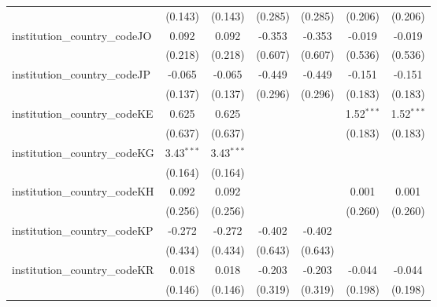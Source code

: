 \begin{tabular}{lcccccc}
                                         & (0.143)        & (0.143)        & (0.285)        & (0.285)        & (0.206)        & (0.206)\\   
   institution\_country\_codeJO          & 0.092          & 0.092          & -0.353         & -0.353         & -0.019         & -0.019\\   
                                         & (0.218)        & (0.218)        & (0.607)        & (0.607)        & (0.536)        & (0.536)\\   
   institution\_country\_codeJP          & -0.065         & -0.065         & -0.449         & -0.449         & -0.151         & -0.151\\   
                                         & (0.137)        & (0.137)        & (0.296)        & (0.296)        & (0.183)        & (0.183)\\   
   institution\_country\_codeKE          & 0.625          & 0.625          &                &                & 1.52$^{***}$   & 1.52$^{***}$\\   
                                         & (0.637)        & (0.637)        &                &                & (0.183)        & (0.183)\\   
   institution\_country\_codeKG          & 3.43$^{***}$   & 3.43$^{***}$   &                &                &                &   \\   
                                         & (0.164)        & (0.164)        &                &                &                &   \\   
   institution\_country\_codeKH          & 0.092          & 0.092          &                &                & 0.001          & 0.001\\   
                                         & (0.256)        & (0.256)        &                &                & (0.260)        & (0.260)\\   
   institution\_country\_codeKP          & -0.272         & -0.272         & -0.402         & -0.402         &                &   \\   
                                         & (0.434)        & (0.434)        & (0.643)        & (0.643)        &                &   \\   
   institution\_country\_codeKR          & 0.018          & 0.018          & -0.203         & -0.203         & -0.044         & -0.044\\   
                                         & (0.146)        & (0.146)        & (0.319)        & (0.319)        & (0.198)        & (0.198)\\   

\end{tabular}
